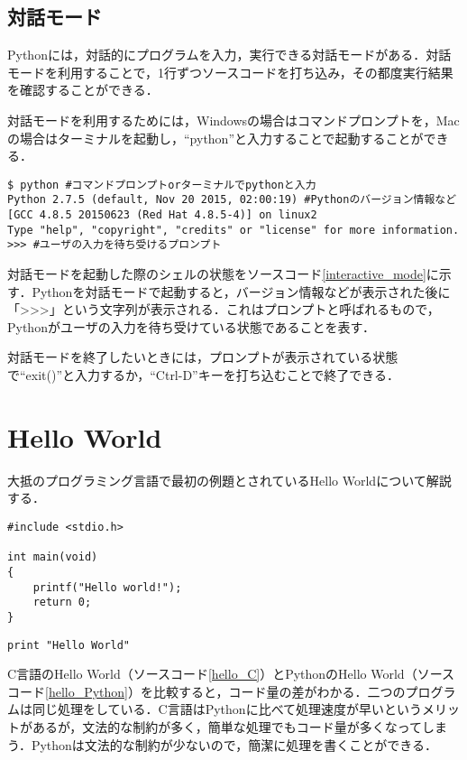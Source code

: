 \subsection{対話モード}
Pythonには，対話的にプログラムを入力，実行できる対話モードがある．対話モードを利用することで，1行ずつソースコードを打ち込み，その都度実行結果を確認することができる．


対話モードを利用するためには，Windowsの場合はコマンドプロンプトを，Macの場合はターミナルを起動し，``python''と入力することで起動することができる．


\begin{lstlisting}[caption=対話モード,label=interactive_mode]
$ python #コマンドプロンプトorターミナルでpythonと入力
Python 2.7.5 (default, Nov 20 2015, 02:00:19) #Pythonのバージョン情報など
[GCC 4.8.5 20150623 (Red Hat 4.8.5-4)] on linux2
Type "help", "copyright", "credits" or "license" for more information.
>>> #ユーザの入力を待ち受けるプロンプト
\end{lstlisting}

対話モードを起動した際のシェルの状態をソースコード\ref{interactive_mode}に示す．Pythonを対話モードで起動すると，バージョン情報などが表示された後に「\textgreater\textgreater\textgreater」という文字列が表示される．これはプロンプトと呼ばれるもので，Pythonがユーザの入力を待ち受けている状態であることを表す．


対話モードを終了したいときには，プロンプトが表示されている状態で``exit()''と入力するか，``Ctrl-D''キーを打ち込むことで終了できる．


\section{Hello World}
大抵のプログラミング言語で最初の例題とされているHello Worldについて解説する．


\begin{lstlisting}[caption=C言語のHello World,label=hello_C]
#include <stdio.h>
 
int main(void)
{
    printf("Hello world!");
    return 0;
}
\end{lstlisting}


\begin{lstlisting}[caption=PythonのHello World,label=hello_Python]
print "Hello World"
\end{lstlisting}


C言語のHello World（ソースコード\ref{hello_C}）とPythonのHello World（ソースコード\ref{hello_Python}）を比較すると，コード量の差がわかる．二つのプログラムは同じ処理をしている．C言語はPythonに比べて処理速度が早いというメリットがあるが，文法的な制約が多く，簡単な処理でもコード量が多くなってしまう．Pythonは文法的な制約が少ないので，簡潔に処理を書くことができる．


